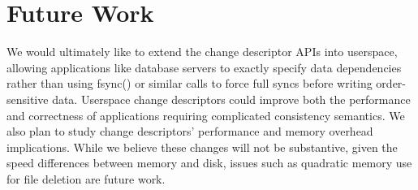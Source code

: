 \preparagraphspacing{}
\section*{Future Work}
\label{sec:future}

We would ultimately like to extend the change descriptor APIs into
userspace, allowing applications like database servers to exactly
specify data dependencies rather than using fsync() or similar calls
to force full syncs before writing order-sensitive data. Userspace
change descriptors could improve both the performance and correctness
of applications requiring complicated consistency semantics. We also
plan to study change descriptors' performance and memory overhead
implications. While we believe these changes will not be substantive,
given the speed differences between memory and disk, issues such as
quadratic memory use for file deletion are future work.
